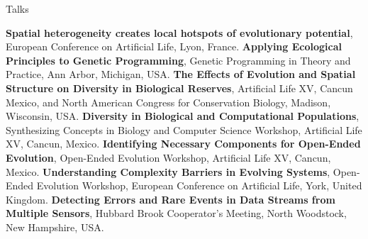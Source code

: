\begin{rubric}{Talks}

\entry*[2017] \textbf{Spatial heterogeneity creates local hotspots of evolutionary potential}, European Conference on Artificial Life, Lyon, France. 
%
\entry*[2017] \textbf{Applying Ecological Principles to Genetic Programming}, Genetic Programming in Theory and Practice, Ann Arbor, Michigan, USA.
%
\entry*[2016] \textbf{The Effects of Evolution and Spatial Structure on Diversity in Biological Reserves}, Artificial Life XV, Cancun Mexico, and North American Congress for Conservation Biology, Madison, Wisconsin, USA. 
%
\entry*[2016] \textbf{Diversity in Biological and Computational Populations}, Synthesizing Concepts in Biology and Computer Science Workshop, Artificial Life XV, Cancun, Mexico. 
%
\entry*[2016] \textbf{Identifying Necessary Components for Open-Ended Evolution}, Open-Ended Evolution Workshop, Artificial Life XV, Cancun, Mexico. 
%
\entry*[2015] \textbf{Understanding Complexity Barriers in Evolving Systems}, Open-Ended Evolution Workshop, European Conference on Artificial Life, York, United Kingdom. 
%
\entry*[2013] \textbf{Detecting Errors and Rare Events in Data Streams from Multiple Sensors}, Hubbard Brook Cooperator's Meeting, North Woodstock, New Hampshire, USA. 
%

\end{rubric}